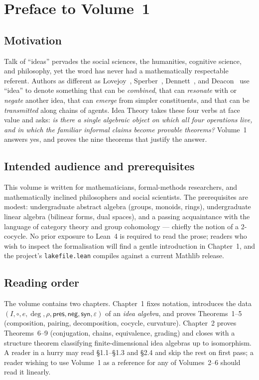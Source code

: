 \documentclass[11pt,oneside]{book}
\begin{document}
\tableofcontents

\chapter*{Preface to Volume~1}

\section*{Motivation}
Talk of ``ideas'' pervades the social sciences, the humanities,
cognitive science, and philosophy, yet the word has never had a
mathematically respectable referent. Authors as different as
Lovejoy~\cite{lovejoy1936}, Sperber~\cite{sperber1996}, Dennett~\cite{dennett1995},
and Deacon~\cite{deacon2012} use ``idea'' to denote something that can
be \emph{combined}, that can \emph{resonate} with or \emph{negate}
another idea, that can \emph{emerge} from simpler constituents, and
that can be \emph{transmitted} along chains of agents. Idea Theory
takes these four verbs at face value and asks: \emph{is there a single
algebraic object on which all four operations live, and in which the
familiar informal claims become provable theorems?} Volume~1 answers
yes, and proves the nine theorems that justify the answer.

\section*{Intended audience and prerequisites}
This volume is written for mathematicians, formal-methods researchers,
and mathematically inclined philosophers and social scientists. The
prerequisites are modest: undergraduate abstract algebra (groups,
monoids, rings), undergraduate linear algebra (bilinear forms, dual
spaces), and a passing acquaintance with the language of category
theory and group cohomology — chiefly the notion of a 2-cocycle. No
prior exposure to Lean~4 is required to read the prose; readers who
wish to inspect the formalisation will find a gentle introduction in
Chapter~1, and the project's \texttt{lakefile.lean} compiles against
a current Mathlib release.

\section*{Reading order}
The volume contains two chapters. Chapter~1 fixes notation,
introduces the data $(I,\circ,e,\deg,\rho,\mathsf{pres},
\mathsf{neg},\mathsf{syn},\varepsilon)$ of an \emph{idea algebra},
and proves Theorems~1--5 (composition, pairing, decomposition,
cocycle, curvature). Chapter~2 proves Theorems~6--9 (conjugation,
chains, equivalence, grading) and closes with a structure theorem
classifying finite-dimensional idea algebras up to isomorphism.
A reader in a hurry may read \S1.1--\S1.3 and \S2.4 and skip the
rest on first pass; a reader wishing to use Volume~1 as a reference
for any of Volumes~2--6 should read it linearly.
\end{document}

